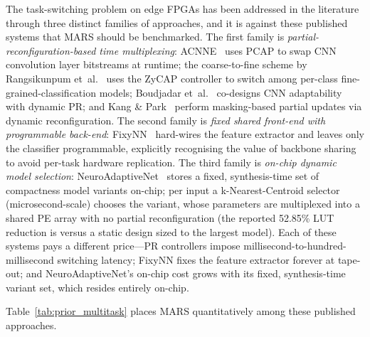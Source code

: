 \documentclass[12pt, a4paper]{report}
\numberwithin{equation}{chapter}
\numberwithin{figure}{chapter}
\numberwithin{table}{chapter}
\numberwithin{algorithm}{chapter}
\begin{document}
The task-switching problem on edge FPGAs has been addressed in the literature through three distinct families of approaches, and it is against these published systems that MARS should be benchmarked. The first family is \emph{partial-reconfiguration-based time multiplexing}: ACNNE~\cite{Huang2024ACNNE} uses PCAP to swap CNN convolution layer bitstreams at runtime; the coarse-to-fine scheme by Rangsikunpum et~al.~\cite{Rangsikunpum2024CoarseToFine} uses the ZyCAP controller to switch among per-class fine-grained-classification models; Boudjadar et~al.~\cite{Boudjadar2025DynamicFPGA} co-designs CNN adaptability with dynamic PR; and Kang \& Park~\cite{Kang2025RuntimeRobust} perform masking-based partial updates via dynamic reconfiguration. The second family is \emph{fixed shared front-end with programmable back-end}: FixyNN~\cite{Whatmough2019FixyNN} hard-wires the feature extractor and leaves only the classifier programmable, explicitly recognising the value of backbone sharing to avoid per-task hardware replication. The third family is \emph{on-chip dynamic model selection}: NeuroAdaptiveNet~\cite{ElBouazzaoui2025NeuroAdaptive} stores a fixed, synthesis-time set of compactness model variants on-chip; per input a k-Nearest-Centroid selector (microsecond-scale) chooses the variant, whose parameters are multiplexed into a shared PE array with no partial reconfiguration (the reported 52.85\% LUT reduction is versus a static design sized to the largest model). Each of these systems pays a different price---PR controllers impose millisecond-to-hundred-millisecond switching latency; FixyNN fixes the feature extractor forever at tape-out; and NeuroAdaptiveNet's on-chip cost grows with its fixed, synthesis-time variant set, which resides entirely on-chip.

Table~\ref{tab:prior_multitask} places MARS quantitatively among these published approaches.
\end{document}
